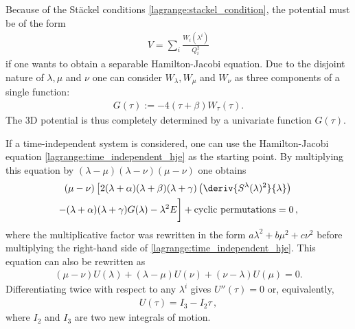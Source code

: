     Because of the St\"ackel conditions \eqref{lagrange:stackel_condition}, the potential must be of the form
    \begin{gather}
        V = \sum_i\frac{W_i(\lambda^i)}{Q_i^2}
    \end{gather}
    if one wants to obtain a separable Hamilton-Jacobi equation. Due to the disjoint nature of $\lambda,\mu$ and $\nu$ one can consider $W_\lambda,W_\mu$ and $W_\nu$ as three components of a single function:
    \begin{gather}
        G(\tau) := -4(\tau+\beta)W_\tau(\tau).
    \end{gather}
    The 3D potential is thus completely determined by a univariate function $G(\tau)$.

    If a time-independent system is considered, one can use the Hamilton-Jacobi equation \eqref{lagrange:time_independent_hje} as the starting point. By multiplying this equation by $(\lambda - \mu)(\lambda - \nu)(\mu - \nu)$ one obtains
    \begin{multline}
        (\mu - \nu)\left[2(\lambda + \alpha)(\lambda + \beta)(\lambda + \gamma)\left(\deriv{S^\lambda(\lambda)^2}{\lambda}\right)\right.\\ - (\lambda + \alpha)(\lambda + \gamma)G(\lambda) - \lambda^2E \bigg] + \text{cyclic permutations} = 0\,,
    \end{multline}
    where the multiplicative factor was rewritten in the form $a\lambda^2 + b\mu^2 + c\nu^2$ before multiplying the right-hand side of \eqref{lagrange:time_independent_hje}. This equation can also be rewritten as
    \begin{gather}
        (\mu-\nu)U(\lambda) + (\lambda-\mu)U(\nu) + (\nu-\lambda)U(\mu) = 0.
    \end{gather}
    Differentiating twice with respect to any $\lambda^i$ gives $U''(\tau) = 0$ or, equivalently,
    \begin{gather}
        U(\tau) = I_3 - I_2\tau\,,
    \end{gather}
    where $I_2$ and $I_3$ are two new integrals of motion.

